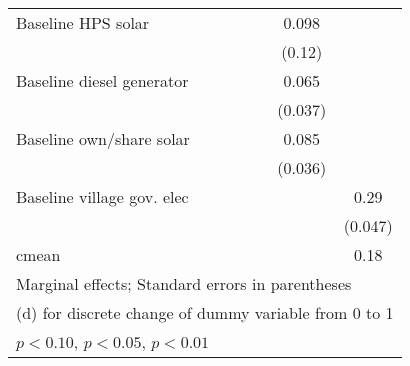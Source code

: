 \begin{table}[htbp]
\begin{tabular*}{1\hsize}{@{\hskip\tabcolsep\extracolsep\fill}l*{6}{c}}
Baseline HPS solar&                  &                  &                  &                  &    0.098         &                  \\
                &                  &                  &                  &                  &   (0.12)         &                  \\
Baseline diesel generator&                  &                  &                  &                  &    0.065\sym{*}  &                  \\
                &                  &                  &                  &                  &  (0.037)         &                  \\
Baseline own/share solar&                  &                  &                  &                  &    0.085\sym{**} &                  \\
                &                  &                  &                  &                  &  (0.036)         &                  \\
Baseline village gov. elec&                  &                  &                  &                  &                  &     0.29\sym{***}\\
                &                  &                  &                  &                  &                  &  (0.047)         \\
\midrule
cmean           &                  &                  &                  &                  &                  &     0.18         \\
\bottomrule
\multicolumn{7}{l}{\footnotesize Marginal effects; Standard errors in parentheses}\\
\multicolumn{7}{l}{\footnotesize  (d) for discrete change of dummy variable from 0 to 1}\\
\multicolumn{7}{l}{\footnotesize \sym{*} \(p<0.10\), \sym{**} \(p<0.05\), \sym{***} \(p<0.01\)}\\
\end{tabular*}
\end{table}
